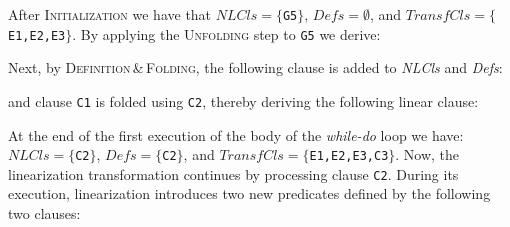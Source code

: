 \documentclass[english]{tlp}
\newcommand{\tts}{\tt \small}
\begin{document}
After \textsc{Initialization} we have that
$\textit{NLCls}=\{${\tts G5}$\}$, $\textit{Defs}=\emptyset$, and 
$\textit{TransfCls}=\{${\tts E1,E2,E3}$\}$.
By applying the \textsc{Unfolding} step to {\tts G5} we derive:

{\small{
\noindent
{}\nopagebreak

\noindent
{}\nopagebreak

\noindent
{}

}} 

\noindent
Next, by \textsc{Definition}\,\&\,\textsc{Folding}, the following clause is added to 
\textit{NLCls} and \textit{Defs}:

{\small{ \noindent
{}

\noindent
{}

}} 

\noindent
and clause {\tt C1} is folded using  {\tt C2}, thereby deriving the following linear clause:

{\small{ \noindent
{}

\noindent
{}

}} 

\noindent
At the end of the first execution of the body of the \textit{while-do} loop we have: 
$\textit{NLCls}=\{${\tts C2}$\}$, $\textit{Defs}=\{${\tts C2}$\}$, and 
$\textit{TransfCls}=\{${\tts E1,E2,E3,C3}$\}$. Now, the {\rm linearization} 
transformation continues by processing clause {\tts C2}.
During its execution, {\rm linearization} introduces two new predicates defined by
the following two clauses:

{\small{ \noindent
{}

\noindent
{}

}} 
\end{document}
